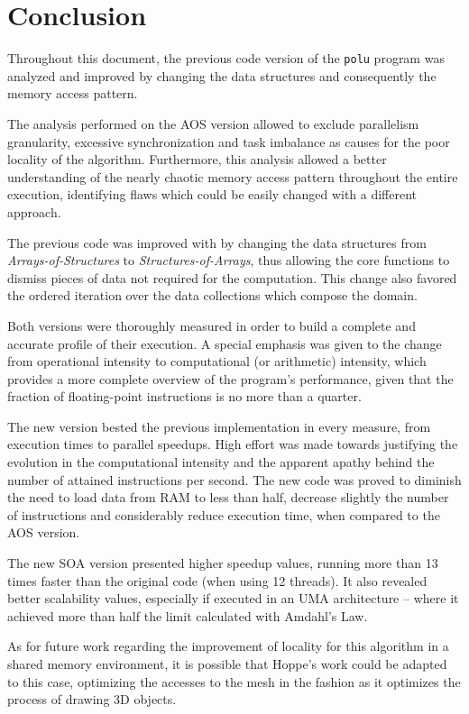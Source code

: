 \documentclass[abstract=on,9pt,twocolumn]{scrartcl}
\begin{document}
\section{Conclusion}
\label{sec:conclusion}
Throughout this document, the previous code version of the \texttt{polu} program was analyzed and improved by changing the data structures and consequently the memory access pattern.

The analysis performed on the AOS version allowed to exclude parallelism granularity, excessive synchronization and task imbalance as causes for the poor locality of the algorithm. Furthermore, this analysis allowed a better understanding of the nearly chaotic memory access pattern throughout the entire execution, identifying flaws which could be easily changed with a different approach.

The previous code was improved with by changing the data structures from \textit{Arrays-of-Structures} to \textit{Structures-of-Arrays}, thus allowing the core functions to dismiss pieces of data not required for the computation. This change also favored the ordered iteration over the data collections which compose the domain.

Both versions were thoroughly measured in order to build a complete and accurate profile of their execution. A special emphasis was given to the change from operational intensity to computational (or arithmetic) intensity, which provides a more complete overview of the program's performance, given that the fraction of floating-point instructions is no more than a quarter.

The new version bested the previous implementation in every measure, from execution times to parallel speedups. High effort was made towards justifying the evolution in the computational intensity and the apparent apathy behind the number of attained instructions per second. The new code was proved to diminish the need to load data from RAM to less than half, decrease slightly the number of instructions and considerably reduce execution time, when compared to the AOS version.

The new SOA version presented higher speedup values, running more than 13 times faster than the original code (when using 12 threads). It also revealed better scalability values, especially if executed in an UMA architecture -- where it achieved more than half the limit calculated with Amdahl's Law.

As for future work regarding the improvement of locality for this algorithm in a shared memory environment, it is possible that Hoppe's work could be adapted to this case, optimizing the accesses to the mesh in the fashion as it optimizes the process of drawing 3D objects.
\end{document}
